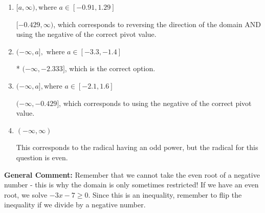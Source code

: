 \documentclass{extbook}[14pt]
\begin{document}
\begin{enumerate}
{\begin{enumerate}[label=\Alph*.]
 $[-2.333, \infty)$, which corresponds to reversing the direction of the domain.
\item \( [a, \infty), \text{where } a \in [-0.91, 1.29] \)

$[-0.429, \infty)$, which corresponds to reversing the direction of the domain AND using the negative of the correct pivot value.
\item \( (-\infty, a], \text{ where } a \in [-3.3, -1.4] \)

* $(-\infty, -2.333]$, which is the correct option.
\item \( (-\infty, a], \text{where } a \in [-2.1, 1.6] \)

$(-\infty, -0.429]$, which corresponds to using the negative of the correct pivot value.
\item \( (-\infty, \infty) \)

This corresponds to the radical having an odd power, but the radical for this question is even.
\end{enumerate}

\textbf{General Comment:} Remember that we cannot take the even root of a negative number - this is why the domain is only sometimes restricted! If we have an even root, we solve $-3 x - 7 \geq 0$. Since this is an inequality, remember to flip the inequality if we divide by a negative number.
}
\end{enumerate}
\end{document}
